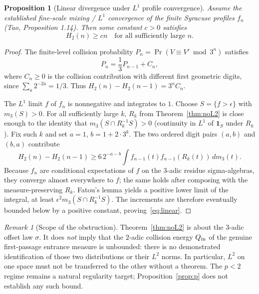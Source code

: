 \documentclass[10pt]{amsart}
\newtheorem{proposition}[theorem]{Proposition}
\theoremstyle{definition}\newtheorem{definition}[theorem]{Definition}
\theoremstyle{remark}\newtheorem{remark}[theorem]{Remark}
\newcommand{\one}{\mathbf1}
\begin{document}
\begin{proposition}[Linear divergence under $L^1$ profile convergence]\label{prop:linear}
Assume the established fine-scale mixing / $L^1$ convergence of the finite Syracuse profiles $f_n$ (Tao, Proposition 1.14). Then some constant $c>0$ satisfies
\begin{equation}\label{eq:linear}
 H_2(n)\ge c n\quad\text{for all sufficiently large }n.
\end{equation}
\end{proposition}
\begin{proof}
The finite-level collision probability $P_n=\Pr(V\equiv V'\bmod3^n)$ satisfies
\[
 P_n=\frac13 P_{n-1}+C_n,
\]
where $C_n\ge0$ is the collision contribution with different first geometric digits, since $\sum_a2^{-2a}=1/3$. Thus $H_2(n)-H_2(n-1)=3^n C_n$.

The $L^1$ limit $f$ of $f_n$ is nonnegative and integrates to $1$. Choose $S=\{f>\epsilon\}$ with $m_3(S)>0$. For all sufficiently large $k$, $R_k$ from Theorem~\ref{thm:noL2} is close enough to the identity that $m_3(S\cap R_k^{-1}S)>0$ (continuity in $L^1$ of $\one_S$ under $R_k$). Fix such $k$ and set $a=1$, $b=1+2\cdot3^k$. The two ordered digit pairs $(a,b)$ and $(b,a)$ contribute
\[
 H_2(n)-H_2(n-1)\ge6\,2^{-a-b}\int f_{n-1}(t)f_{n-1}(R_k(t))\,dm_3(t).
\]
Because $f_n$ are conditional expectations of $f$ on the $3$-adic residue sigma-algebras, they converge almost everywhere to $f$; the same holds after composing with the measure-preserving $R_k$. Fatou's lemma yields a positive lower limit of the integral, at least $\epsilon^2m_3(S\cap R_k^{-1}S)$. The increments are therefore eventually bounded below by a positive constant, proving~\eqref{eq:linear}.
\end{proof}

\begin{remark}[Scope of the obstruction]
Theorem~\ref{thm:noL2} is about the $3$-adic offset law $\sigma$. It does \emph{not} imply that the $2$-adic collision energy $Q_{\rm in}$ of the genuine first-passage entrance measure is unbounded: there is no demonstrated identification of those two distributions or their $L^2$ norms. In particular, $L^2$ on one space must not be transferred to the other without a theorem. The $p<2$ regime remains a natural regularity target; Proposition~\ref{prop:p} does not establish any such bound.
\end{remark}
\end{document}
